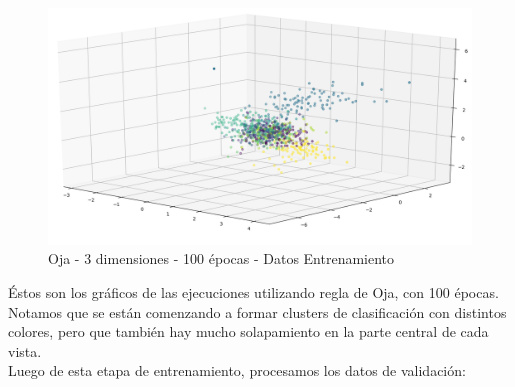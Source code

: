 \begin{figure}[h]
  \begin{center}
    \includegraphics[scale=0.45]{../img/ej1/oja/oja_3salida_100ep_train.png}
  \caption{Oja - 3 dimensiones - 100 épocas - Datos Entrenamiento}
  \end{center}
\end{figure}

Éstos son los gráficos de las ejecuciones utilizando regla de Oja, con 100 épocas. Notamos que se están comenzando a formar
clusters de clasificación con distintos colores, pero que también hay mucho solapamiento en la parte central de cada vista.\\

Luego de esta etapa de entrenamiento, procesamos los datos de validación:

